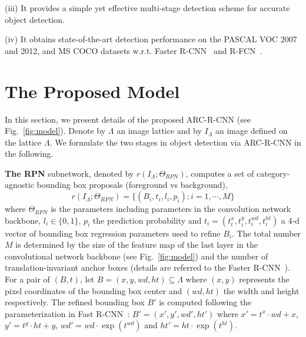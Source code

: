 \documentclass[10pt,twocolumn,letterpaper]{article}
\begin{document}
(iii) It provides a simple yet effective multi-stage detection scheme for accurate object detection.

(iv) It obtains state-of-the-art detection performance on the PASCAL VOC 2007 and 2012, and MS COCO datasets w.r.t. Faster R-CNN~\cite{faster_rcnn} and R-FCN~\cite{rfcn}.



\vspace{-2mm}
\section{The Proposed Model} \label{sec:model}
\vspace{-1mm}
In this section, we present details of the proposed ARC-R-CNN (see Fig.~\ref{fig:model}). 
Denote by $\Lambda$ an image lattice and by $I_{\Lambda}$ an image defined on the lattice $\Lambda$. We formulate the two stages in object detection via ARC-R-CNN in the following. 

\textbf{The RPN} subnetwork, denoted by $r(I_{\Lambda};\Theta_{RPN})$,  computes a set of category-agnostic bounding box proposals (foreground vs background),
\begin{equation}
r(I_{\Lambda};\Theta_{RPN})=\{(B_i, t_i, l_i, p_i); i=1,\cdots, M\}\label{eqn:RPNscoring}
\end{equation}  
where $\Theta_{RPN}$ is the parameters including parameters in the convolution network backbone, $l_i\in\{0, 1\}$, $p_i$ the prediction probability and $t_i=(t_i^x, t_i^y, t_i^{wd}, t_i^{ht})$ a 4-d vector of bounding box regression parameters used to refine $B_i$. The total number $M$ is determined by the size of the feature map of the last layer in the convolutional network backbone (see Fig.~\ref{fig:model}) and the number of translation-invariant anchor boxes (details are referred to the Faster R-CNN~\cite{faster_rcnn}). For a pair of $(B, t)$, let $B=(x, y, wd, ht)\subseteq \Lambda$ where $(x,y)$ represents the pixel coordinates of the bounding box center and $(wd, ht)$ the width and height respectively. The refined bounding box $B'$ is computed following the parameterization in Fast R-CNN~\cite{fast_rcnn}: $B'=(x', y', wd', ht')$ where  
$x' = t^x \cdot wd + x$, $y' = t^y \cdot ht + y$, $wd' = wd \cdot \exp(t^{wd})$ and $ht' = ht \cdot \exp(t^{ht})$.
\end{document}
